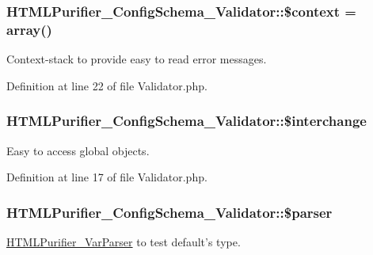 \hypertarget{classHTMLPurifier__ConfigSchema__Validator_a95e7c52bbfd59ebe6ad904caf4419893}{
\subsubsection[{\$context}]{\setlength{\rightskip}{0pt plus 5cm}H\+T\+M\+L\+Purifier\+\_\+\+Config\+Schema\+\_\+\+Validator\+::\$context = array()\hspace{0.3cm}{\ttfamily [protected]}}}\label{classHTMLPurifier__ConfigSchema__Validator_a95e7c52bbfd59ebe6ad904caf4419893}
Context-\/stack to provide easy to read error messages. 

Definition at line 22 of file Validator.\+php.

\hypertarget{classHTMLPurifier__ConfigSchema__Validator_ad8cfb6b080ccbc19ea3754914d9fd81c}{
\subsubsection[{\$interchange}]{\setlength{\rightskip}{0pt plus 5cm}H\+T\+M\+L\+Purifier\+\_\+\+Config\+Schema\+\_\+\+Validator\+::\$interchange\hspace{0.3cm}{\ttfamily [protected]}}}\label{classHTMLPurifier__ConfigSchema__Validator_ad8cfb6b080ccbc19ea3754914d9fd81c}
Easy to access global objects. 

Definition at line 17 of file Validator.\+php.

\hypertarget{classHTMLPurifier__ConfigSchema__Validator_ae468f8373f7f510ac0c972d9fd0b9b61}{
\subsubsection[{\$parser}]{\setlength{\rightskip}{0pt plus 5cm}H\+T\+M\+L\+Purifier\+\_\+\+Config\+Schema\+\_\+\+Validator\+::\$parser\hspace{0.3cm}{\ttfamily [protected]}}}\label{classHTMLPurifier__ConfigSchema__Validator_ae468f8373f7f510ac0c972d9fd0b9b61}
\hyperlink{classHTMLPurifier__VarParser}{H\+T\+M\+L\+Purifier\+\_\+\+Var\+Parser} to test default's type. 

